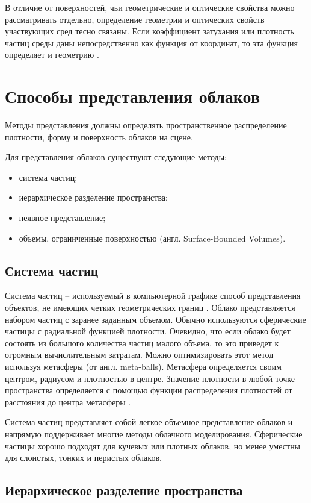 В отличие от поверхностей, чьи геометрические и оптические свойства можно рассматривать отдельно, определение геометрии и оптических свойств участвующих сред тесно связаны. Если коэффициент затухания или плотность частиц среды даны непосредственно как функция от координат, то эта функция определяет и геометрию \cite{partmedia}.  


\section{Способы представления облаков}
Методы представления должны определять пространственное распределение плотности, форму и поверхность облаков на сцене.

Для представления облаков существуют следующие методы:
\begin{itemize}
	\item система частиц;
	\item иерархическое разделение пространства;
	\item неявное представление;
	\item объемы, ограниченные поверхностью (англ. Surface-Bounded Volumes).
\end{itemize}

\subsection{Система частиц}
\label{particles}
Система частиц -- используемый в компьютерной графике способ представления объектов, не имеющих четких геометрических границ \cite{particles1}. 
Облако представляется набором частиц с заранее заданным объемом. Обычно используются сферические частицы с радиальной функцией плотности. Очевидно, что если облако будет состоять из большого количества частиц малого объема, то это приведет к огромным вычислительным затратам. Можно оптимизировать этот метод используя метасферы (от англ. meta-balls). Метасфера определяется своим центром, радиусом и плотностью в центре. Значение плотности в любой точке пространства определяется с помощью функции распределения плотностей от расстояния до центра метасферы \cite{nishita}. 

Система частиц представляет собой легкое объемное представление облаков и напрямую поддерживает многие методы облачного моделирования. Сферические частицы хорошо подходят для кучевых или плотных облаков, но менее уместны для слоистых, тонких и перистых облаков.

\subsection{Иерархическое разделение пространства} 

